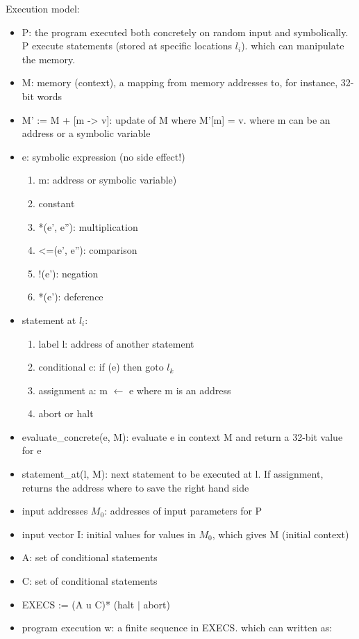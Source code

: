 Execution model:
\begin{itemize}
  \item P: the program executed both concretely on random input and symbolically. P execute statements (stored at specific locations $l_i$). which can manipulate the memory.
  \item M: memory (context), a mapping from memory addresses to, for instance, 32-bit words
  \item M' := M + [m -> v]: update of M where M'[m] = v. where m can be an address or a symbolic variable
  \item e: symbolic expression (no side effect!)
    \begin{enumerate}
      \item m: address or symbolic variable)
      \item constant
      \item *(e', e''): multiplication
      \item <=(e', e''): comparison
      \item !(e'): negation
      \item *(e'): deference
    \end{enumerate}
  \item statement at $l_i$:
    \begin{enumerate}
      \item label l: address of another statement
      \item conditional c: if (e) then goto $l_k$
      \item assignment a: m $\gets$ e where m is an address
      \item abort or halt
    \end{enumerate}
  \item evaluate\_concrete(e, M): evaluate e in context M and return a 32-bit value for e
  \item statement\_at(l, M): next statement to be executed at l. If assignment, returns the address where to save the right hand side
  \item input addresses $M_0$: addresses of input parameters for P
  \item input vector I: initial values for values in $M_0$, which gives M (initial context)
  \item A: set of conditional statements
  \item C: set of conditional statements
  \item EXECS := (A u C)* (halt $|$ abort)
  \item program execution w: a finite sequence in EXECS. which can written as:
  

\end{itemize}
